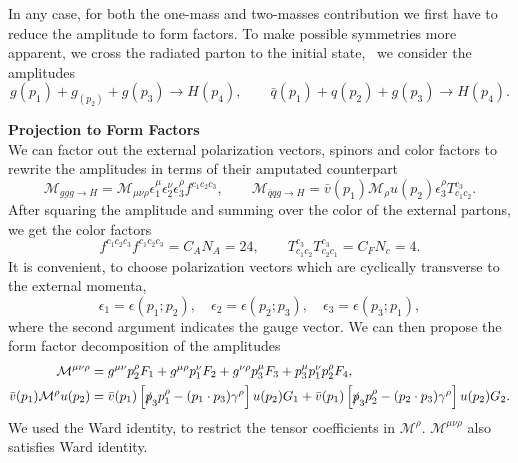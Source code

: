 In any case, for both the one-mass and two-masses contribution we first have to reduce the amplitude to form factors. To make possible symmetries more apparent, we cross the radiated parton to the initial state, \ie\ we consider the amplitudes
\begin{equation}
g(p_1) + g_(p_2) + g(p_3) \longrightarrow H(p_4), \qquad \bar{q}(p_1) + q(p_2) + g(p_3) \longrightarrow H(p_4).
\end{equation}

\textbf{Projection to Form Factors}\\
We can factor out the external polarization vectors, spinors and color factors to rewrite the amplitudes in terms of their amputated counterpart
\begin{equation}
\mathcal{M}_{ggg \rightarrow H} = \mathcal{M}_{\mu \nu \rho} \epsilon_1^\mu \epsilon_2^\nu \epsilon_3^\rho f^{c_1 c_2 c_3}, \qquad \mathcal{M}_{\bar{q} q g \rightarrow H} = \bar{v}(p_1) \mathcal{M}_{\rho} u(p_2) \epsilon_3^\rho T^{c_3}_{c_1 c_2}.
\end{equation}
After squaring the amplitude and summing over the color of the external partons, we get the color factors
\begin{equation}
f^{c_1 c_2 c_3} f^{c_1 c_2 c_3} = C_A N_A = 24, \qquad T^{c_3}_{c_1 c_2} T^{c_{3}}_{c_2 c_1} = C_F N_c = 4.
\end{equation}
It is convenient, to choose polarization vectors which are cyclically transverse to the external momenta, \ie\
\begin{equation}
\epsilon_1 = \epsilon (p_1; p_2), \quad \epsilon_2 = \epsilon (p_2; p_3), \quad \epsilon_3 = \epsilon (p_3; p_1),
\end{equation}
where the second argument indicates the gauge vector. We can then propose the form factor decomposition of the amplitudes
\begin{equation}
\begin{split}
\mathcal{M}^{\mu \nu \rho} &= g^{\mu \nu} p_2^\rho F_1 + g^{\mu \rho} p_1^\nu F_2 + g^{\nu \rho} p_3^\mu F_3 + p_3^\mu p_1^\nu p_2^\rho F_4, \\
\bar{v}(p_1) \mathcal{M}^{\rho} u(p_2) &= \bar{v}(p_1)\left[ \slashed{p}_3 p_1^\rho - (p_1 \cdot p_3) \gamma^\rho \right] u(p_2) G_1 + \bar{v}(p_1) \left[ \slashed{p}_3 p_2^\rho - (p_2 \cdot p_3) \gamma^\rho \right] u(p_2) G_2.
\end{split}
\end{equation}
We used the Ward identity, to restrict the tensor coefficients in $\mathcal{M}^\rho$. $\mathcal{M}^{\mu \nu \rho}$ also satisfies Ward identity.

